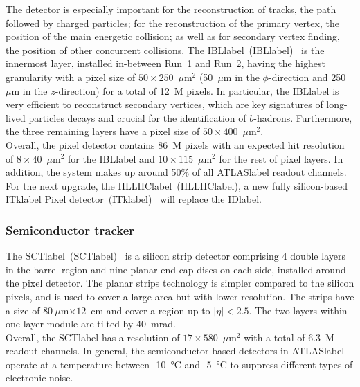The detector is especially important for the reconstruction of tracks, the path followed by charged particles; for the reconstruction of the primary vertex, the position of the main energetic collision; as well as for secondary vertex finding, the position of other concurrent collisions. The \acrlong{IBLlabel}~(\acrshort{IBLlabel})~\cite{Capeans:1291633} is the innermost layer, installed in-between Run~1 and Run~2, having the highest granularity with a pixel size of $50\times 250$~$\mu$m$^2$ (50~$\mu$m in the $\phi$-direction and 250~$\mu$m in the $z$-direction) for a total of 12~M pixels. In particular, the \acrshort{IBLlabel} is very efficient to reconstruct secondary vertices, which are key signatures of long-lived particles decays and crucial for the identification of $b$-hadrons. Furthermore, the three remaining layers have a pixel size of $50\times 400$~$\mu$m$^2$.\\

Overall, the pixel detector contains 86~M pixels with an expected hit resolution of $8\times 40$~$\mu$m$^2$ for the \acrshort{IBLlabel} and $10\times 115$~$\mu$m$^2$ for the rest of pixel layers. In addition, the system makes up around 50\% of all \acrshort{ATLASlabel} readout channels. For the next upgrade, the \acrlong{HLLHClabel}~(\acrshort{HLLHClabel}), a new fully silicon-based \acrlong{ITklabel} Pixel detector~(\acrshort{ITklabel})~\cite{CERN-LHCC-2017-021} will replace the \acrshort{IDlabel}.

\subsubsection*{Semiconductor tracker}

The \acrlong{SCTlabel}~(\acrshort{SCTlabel})~\cite{HABER1998161,SCTperformance} is a silicon strip detector comprising 4 double layers in the barrel region and nine planar end-cap discs on each side, installed around the pixel detector. The planar strips technology is simpler compared to the silicon pixels, and is used to cover a large area but with lower resolution. The strips have a size of $80~\mu$m$\times 12$~cm and cover a region up to $|\eta|<2.5$. The two layers within one layer-module are tilted by 40~mrad.\\

Overall, the \acrshort{SCTlabel} has a resolution of $17\times 580$~$\mu$m$^2$ with a total of 6.3~M readout channels. In general, the semiconductor-based detectors in \acrshort{ATLASlabel} operate at a temperature between -10~°C and -5~°C to suppress different types of electronic noise.


